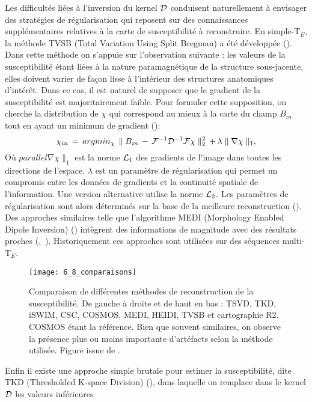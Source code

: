 {Les difficultés liées à l’inversion du kernel ${\cal D}$ conduisent naturellement à envisager des
stratégies de régularisation qui reposent sur des connaissances supplémentaires relatives à la carte de
susceptibilité à reconstruire. En simple-T$_E$, la méthode TVSB (Total Variation Using Split Bregman) a
été développée (\cite{Bilgic2012}). Dans cette méthode on s’appuie sur l’observation suivante : les valeurs de la
susceptibilité étant liées à la nature paramagnétique de la structure sous-jacente, elles doivent varier
de façon lisse à l'intérieur des structures anatomiques d’intérêt. Dans ce cas, il est naturel de supposer
que le gradient de la susceptibilité est majoritairement faible. Pour formuler cette supposition, on cherche la distribution de $\chi$ qui correspond au mieux à la carte du champ $B_{in}$ tout en ayant un
minimum de gradient (\cite{Bilgic2012}):
\begin{equation}
\label{eq:min_gradient}
\chi_{in}\,=\,argmin_{\chi}\,\parallel B_{in}\,-\,{\cal F}^{-1}{\cal D}^{-1}{\cal F}\chi\parallel_2^2\,+\,\lambda\parallel\nabla\chi\parallel_1,
\end{equation}
Où $parallel\nabla\chi\parallel_1$ est la norme ${\cal L}_1$ des gradients de l'image dans toutes les directions de l'espace. $\lambda$ est un
paramètre de régularisation qui permet un compromis entre les données de gradients et la continuité
spatiale de l'information. Une version alternative utilise la norme ${\cal L}_2$. Les paramètres de régularisation
sont alors déterminés sur la base de la meilleure reconstruction (\cite{Bilgic2012}). Des approches similaires telle
que l’algorithme MEDI (Morphology Enabled Dipole Inversion) (\cite{Liu2011c}) intègrent des informations de
magnitude avec des résultats proches (\cite{DeRochefort2010},~\cite{Schweser2012}). Historiquement ces approches sont utilisées sur des
séquences multi-T$_E$. 
\begin{figure}[!t]
\centering
\texttt{[image: 6\_8\_comparaisons]}
\caption{Comparaison de différentes méthodes de reconstruction de la susceptibilité. De gauche à droite et de haut en
bas : TSVD, TKD, iSWIM, CSC, COSMOS, MEDI, HEIDI, TVSB et cartographie R2. COSMOS étant la référence. Bien que souvent
similaires, on observe la présence plus ou moins importante d’artéfacts selon la méthode utilisée. Figure issue de \cite{Wang_Liu_2014}.}
\label{fig:6_8_comparaisons}	
\end{figure}
Enfin il existe une approche simple brutale pour estimer la susceptibilité, dite TKD
(Thresholded K-space Division) (\cite{Shmueli2009}), dans laquelle on remplace dans le kernel ${\cal D}$ les valeurs inférieures
}
